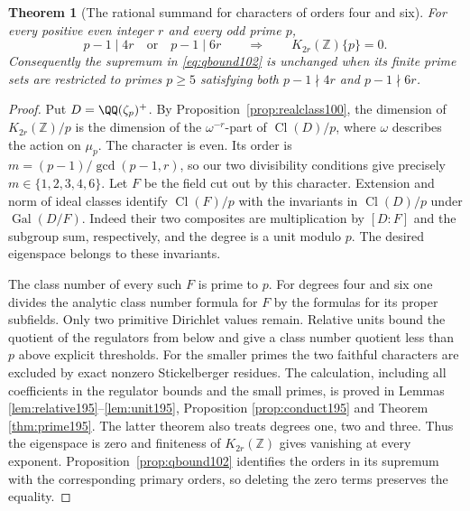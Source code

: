 \documentclass[a4paper,11pt]{article}
\newtheorem{theorem}[proposition]{Theorem}
\theoremstyle{definition}
\theoremstyle{remark}
\newcommand{\ZZ}{\mathbb Z}\newcommand{\ord}{\operatorname{ord}}
\numberwithin{equation}{section}
\begin{document}
\begin{theorem}[The rational summand for characters of orders four and six]
\label{thm:units196}
For every positive even integer \(r\) and every odd prime \(p\),
\[
         p-1\mid4r\quad\text{or}\quad p-1\mid6r
        \qquad\Longrightarrow\qquad K_{2r}(\ZZ)\{p\}=0 .
\]
Consequently the supremum in \eqref{eq:qbound102} is unchanged
when its finite prime sets are restricted to primes \(p\ge5\)
satisfying both \(p-1\nmid4r\) and \(p-1\nmid6r\).
\end{theorem}
\begin{proof}
Put \(D=\QQ(\zeta_p)^+\). By Proposition~\ref{prop:realclass100},
the dimension of \(K_{2r}(\ZZ)/p\) is the dimension of the
\(\omega^{-r}\)-part of \(\operatorname{Cl}(D)/p\), where
\(\omega\) describes the action on \(\mu_p\). The character is
even. Its order is \(m=(p-1)/\gcd(p-1,r)\), so our two divisibility
conditions give precisely \(m\in\{1,2,3,4,6\}\). Let \(F\) be
the field cut out by this character. Extension and norm of ideal
classes identify \(\operatorname{Cl}(F)/p\) with the invariants in
\(\operatorname{Cl}(D)/p\) under \(\operatorname{Gal}(D/F)\).
Indeed their two composites are multiplication by \([D:F]\)
and the subgroup sum, respectively, and the degree is a unit
modulo \(p\). The desired eigenspace belongs to these invariants.

The class number of every such \(F\) is prime to \(p\). For degrees
four and six one divides the analytic class number formula for
\(F\) by the formulas for its proper subfields. Only two primitive
Dirichlet values remain. Relative units bound the quotient of
the regulators from below and give a class number quotient less
than \(p\) above explicit thresholds. For the smaller primes
the two faithful characters are excluded by exact nonzero
Stickelberger residues. The calculation, including all
coefficients in the regulator bounds and the small primes, is
proved in Lemmas \ref{lem:relative195}--\ref{lem:unit195}, Proposition \ref{prop:conduct195} and Theorem \ref{thm:prime195}.
The latter theorem also treats degrees one, two and three.
Thus the eigenspace is zero and finiteness of \(K_{2r}(\ZZ)\)
gives vanishing at every exponent. Proposition~\ref{prop:qbound102}
identifies the orders in its supremum with the corresponding primary
orders, so deleting the zero terms preserves the equality.
\end{proof}
\end{document}
